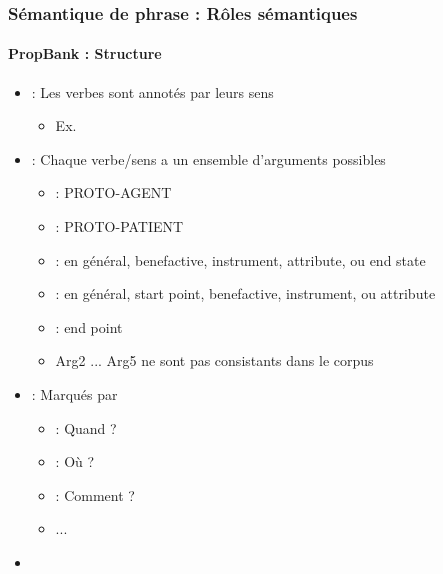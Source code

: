 \documentclass[xcolor=table]{beamer}
\begin{document}
\begin{frame}
	\frametitle{Sémantique de phrase : Rôles sémantiques}
	\framesubtitle{PropBank : Structure}
	
	\begin{itemize}
		\item {} : Les verbes sont annotés par leurs sens 
		\begin{itemize}
			\item Ex. 		
		\end{itemize}
		
		\item {} : Chaque verbe/sens a un ensemble d'arguments possibles  
		\begin{itemize}
			\item {} : PROTO-AGENT
			\item {} : PROTO-PATIENT
			\item {} : en général, benefactive, instrument, attribute, ou end state
			\item {} : en général, start point, benefactive, instrument, ou attribute
			\item {} : end point
			\item Arg2 ... Arg5 ne sont pas consistants dans le corpus
		\end{itemize}
	
		\item {} : Marqués par   
		\begin{itemize}
			\item {} : Quand ?
			\item {} : Où ?
			\item {} : Comment ? 
			\item ...
		\end{itemize}
		
		\item {} 
	\end{itemize}
	
\end{frame}
\end{document}

